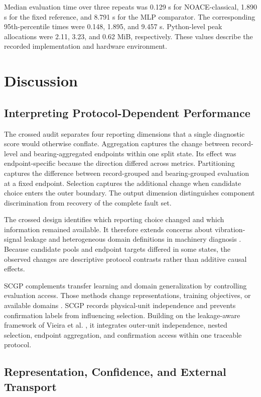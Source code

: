 \documentclass[machines,article,submit,oneauthor,pdftex]{Definitions/mdpi}
\begin{document}
Median evaluation time over three repeats was 0.129 s for NOACE-classical, 1.890 s for the fixed reference, and 8.791 s for the MLP comparator. The corresponding 95th-percentile times were 0.148, 1.895, and 9.457 s. Python-level peak allocations were 2.11, 3.23, and 0.62 MiB, respectively. These values describe the recorded implementation and hardware environment.

\section{Discussion}

\subsection{Interpreting Protocol-Dependent Performance}

The crossed audit separates four reporting dimensions that a single diagnostic score would otherwise conflate. Aggregation captures the change between record-level and bearing-aggregated endpoints within one split state. Its effect was endpoint-specific because the direction differed across metrics. Partitioning captures the difference between record-grouped and bearing-grouped evaluation at a fixed endpoint. Selection captures the additional change when candidate choice enters the outer boundary. The output dimension distinguishes component discrimination from recovery of the complete fault set.

The crossed design identifies which reporting choice changed and which information remained available. It therefore extends concerns about vibration-signal leakage and heterogeneous domain definitions in machinery diagnosis \cite{r32,r33,r34}. Because candidate pools and endpoint targets differed in some states, the observed changes are descriptive protocol contrasts rather than additive causal effects.

SCGP complements transfer learning and domain generalization by controlling evaluation access. Those methods change representations, training objectives, or available domains \cite{r03,r15,r20,r33}. SCGP records physical-unit independence and prevents confirmation labels from influencing selection. Building on the leakage-aware framework of Vieira et al. \cite{r44}, it integrates outer-unit independence, nested selection, endpoint aggregation, and confirmation access within one traceable protocol.

\subsection{Representation, Confidence, and External Transport}
\end{document}
